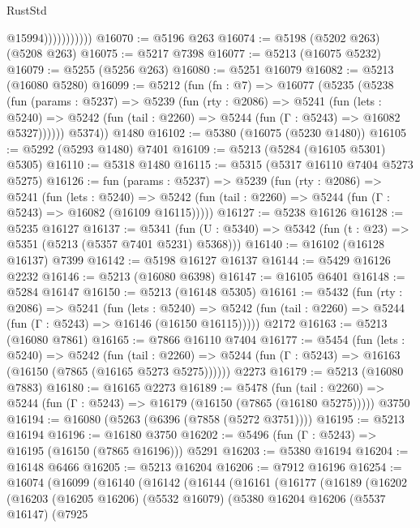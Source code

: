 \begin{lexlean}{RustStd}
\begin{coremodule}
                          @15994)))))))))))
@16070 := @5196 @263
@16074 := @5198 (@5202 @263) (@5208 @263)
@16075 := @5217 @7398
@16077 := @5213 (@16075 @5232)
@16079 := @5255 (@5256 @263)
@16080 := @5251 @16079
@16082 := @5213 (@16080 @5280)
@16099 := @5212
    (fun (fn : @7) =>
    @16077
      (@5235
        (@5238
          (fun (params : @5237) =>
          @5239
            (fun (rty : @2086) =>
            @5241
              (fun (lets : @5240) =>
              @5242 (fun (tail : @2260) => @5244 (fun (Γ : @5243) => @16082 @5327))))))
        @5374))
    @1480
@16102 := @5380 (@16075 (@5230 @1480))
@16105 := @5292 (@5293 @1480) @7401
@16109 := @5213 (@5284 (@16105 @5301) @5305)
@16110 := @5318 @1480
@16115 := @5315 (@5317 @16110 @7404 @5273 @5275)
@16126 := fun (params : @5237) =>
  @5239
    (fun (rty : @2086) =>
    @5241
      (fun (lets : @5240) =>
      @5242 (fun (tail : @2260) => @5244 (fun (Γ : @5243) => @16082 (@16109 @16115)))))
@16127 := @5238 @16126
@16128 := @5235 @16127
@16137 := @5341
    (fun (U : @5340) => @5342 (fun (t : @23) => @5351 (@5213 (@5357 @7401 @5231) @5368)))
@16140 := @16102 (@16128 @16137) @7399
@16142 := @5198 @16127 @16137
@16144 := @5429 @16126 @2232
@16146 := @5213 (@16080 @6398)
@16147 := @16105 @6401
@16148 := @5284 @16147
@16150 := @5213 (@16148 @5305)
@16161 := @5432
    (fun (rty : @2086) =>
    @5241
      (fun (lets : @5240) =>
      @5242 (fun (tail : @2260) => @5244 (fun (Γ : @5243) => @16146 (@16150 @16115)))))
    @2172
@16163 := @5213 (@16080 @7861)
@16165 := @7866 @16110 @7404
@16177 := @5454
    (fun (lets : @5240) =>
    @5242
      (fun (tail : @2260) =>
      @5244 (fun (Γ : @5243) => @16163 (@16150 (@7865 (@16165 @5273 @5275))))))
    @2273
@16179 := @5213 (@16080 @7883)
@16180 := @16165 @2273
@16189 := @5478
    (fun (tail : @2260) => @5244 (fun (Γ : @5243) => @16179 (@16150 (@7865 (@16180 @5275)))))
    @3750
@16194 := @16080 (@5263 (@6396 (@7858 (@5272 @3751))))
@16195 := @5213 @16194
@16196 := @16180 @3750
@16202 := @5496 (fun (Γ : @5243) => @16195 (@16150 (@7865 @16196))) @5291
@16203 := @5380 @16194
@16204 := @16148 @6466
@16205 := @5213 @16204
@16206 := @7912 @16196
@16254 := @16074
    (@16099
      (@16140
        (@16142
          (@16144
            (@16161
              (@16177
                (@16189
                  (@16202
                    (@16203
                      (@16205 @16206)
                      (@5532 @16079)
                      (@5380
                        @16204
                        @16206
                        (@5537 @16147)
                        (@7925

\end{coremodule}
\end{lexlean}
